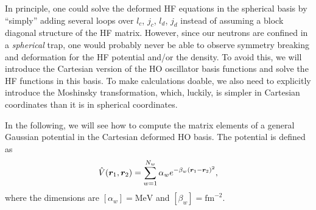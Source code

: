 In principle, one could solve the deformed HF equations in the spherical basis 
by ``simply'' adding several loops over $l_{c}$, $j_{c}$, $l_{d}$, $j_{d}$ 
instead of assuming a block diagonal structure of the HF matrix. However, since 
our neutrons are confined in a {\em spherical} trap, one would probably never 
be able to observe symmetry breaking and deformation for the HF potential 
and/or the density. To avoid this, we will introduce the Cartesian version of 
the HO oscillator basis functions and solve the HF functions in this basis. To 
make calculations doable, we also need to explicitly introduce the Moshinsky 
transformation, which, luckily, is simpler in Cartesian coordinates than it is 
in spherical coordinates.

In the following, we will see how to compute the matrix elements of a general 
Gaussian potential in the Cartesian deformed HO basis. The potential is defined 
as
\begin{equation}
\hat{V}(\boldsymbol{r}_{1}, \boldsymbol{r}_{2}) = 
\sum_{w=1}^{N_{w}} \alpha_{w} e^{-\beta_{w}(\boldsymbol{r}_{1} - \boldsymbol{r}_{2})^{2}},
\end{equation}
where the dimensions are $[\alpha_{w}] = \text{MeV}$ and 
$[\beta_{w}] = \text{fm}^{-2}$.

